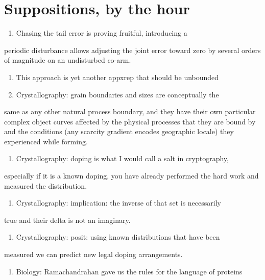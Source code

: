 \chapter{Suppositions, by the hour}

\begin{enumerate}
\item Chasing the tail error is proving fruitful, introducing a 
\end{enumerate}

periodic disturbance allows adjusting the joint error toward zero by several orders of magnitude on an undisturbed co-arm.

\begin{enumerate}
\item This approach is yet another appxrep that should be unbounded
\item Crystallography: grain boundaries and sizes are conceptually the 
\end{enumerate}

same as any other natural process boundary, and they have their own particular complex object curves affected by the physical processes that they are bound by and the conditions (any scarcity gradient encodes geographic locale) they experienced while forming.

\begin{enumerate}
\item Crystallography: doping is what I would call a salt in cryptography, 
\end{enumerate}

especially if it is a known doping, you have already performed the hard work and measured the distribution.

\begin{enumerate}
\item Crystallography: implication: the inverse of that set is necessarily
\end{enumerate}

true and their delta is not an imaginary.

\begin{enumerate}
\item Crystallography: posit: using known distributions that have been 
\end{enumerate}

measured we can predict new legal doping arrangements.

\begin{enumerate}
\item Biology: Ramachandrahan gave us the rules for the language of proteins 
\end{enumerate}

